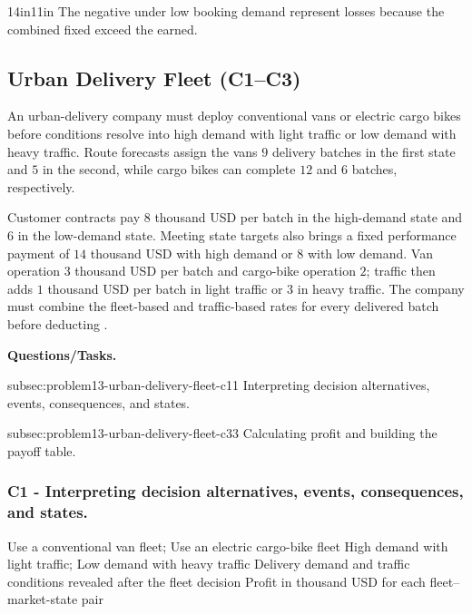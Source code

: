 \begin{CalculationLandscape}{14in}{11in}
	The negative  under low booking demand represent losses because the
	combined fixed  exceed the  earned.


\end{CalculationLandscape}


	\subsection{Urban Delivery Fleet (C1--C3)}
	\label{sec:problem13-urban-delivery-fleet-c1-c3}

	An urban-delivery company must deploy conventional vans or electric cargo bikes before conditions resolve into high demand with light traffic or low demand with heavy traffic. Route forecasts assign the vans \(9\) delivery batches in the first state and \(5\) in the second, while cargo bikes can complete \(12\) and \(6\) batches, respectively.

	Customer contracts pay \(8\) thousand USD per batch in the high-demand state and \(6\) in the low-demand state. Meeting state targets also brings a fixed performance payment of \(14\) thousand USD with high demand or \(8\) with low demand. Van operation  \(3\) thousand USD per batch and cargo-bike operation \(2\); traffic then adds \(1\) thousand USD per batch in light traffic or \(3\) in heavy traffic. The company must combine the fleet-based and traffic-based rates for every delivered batch before deducting .

	\textbf{Questions/Tasks.}
	\begin{enumerate}
		\CriterionTask
		{subsec:problem13-urban-delivery-fleet-c1}{1}
		{Interpreting decision alternatives, events, consequences, and states.}

		\CriterionTask
		{subsec:problem13-urban-delivery-fleet-c3}{3}
		{Calculating profit and building the payoff table.}
	\end{enumerate}

	\subsubsection*{C1 - Interpreting decision alternatives, events, consequences, and states.}
	\label{subsec:problem13-urban-delivery-fleet-c1}

	\DecisionElementsTable
	{Use a conventional van fleet; Use an electric cargo-bike fleet}
	{High demand with light traffic; Low demand with heavy traffic}
	{Delivery demand and traffic conditions revealed after the fleet decision}
	{Profit in thousand USD for each fleet--market-state pair}

